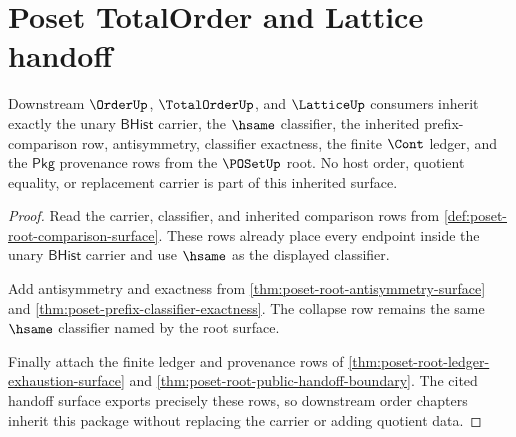 \section{Poset TotalOrder and Lattice handoff}
\label{sec:poset-totalorder-lattice-handoff}

\begin{theorem}
\label{thm:poset-totalorder-lattice-handoff-carrier}
Downstream $\OrderUp$, $\TotalOrderUp$, and $\LatticeUp$ consumers inherit
exactly the unary $\mathsf{BHist}$ carrier, the $\hsame$ classifier, the
inherited prefix-comparison row, antisymmetry, classifier exactness, the
finite $\Cont$ ledger, and the $\mathsf{Pkg}$ provenance rows from the
$\POSetUp$ root. No host order, quotient equality, or replacement carrier is
part of this inherited surface.
\end{theorem}
\begin{proof}
Read the carrier, classifier, and inherited comparison rows from
\autoref{def:poset-root-comparison-surface}. These rows already place every
endpoint inside the unary $\mathsf{BHist}$ carrier and use $\hsame$ as the
displayed classifier.

Add antisymmetry and exactness from
\autoref{thm:poset-root-antisymmetry-surface} and
\autoref{thm:poset-prefix-classifier-exactness}. The collapse row remains the
same $\hsame$ classifier named by the root surface.

Finally attach the finite ledger and provenance rows of
\autoref{thm:poset-root-ledger-exhaustion-surface} and
\autoref{thm:poset-root-public-handoff-boundary}. The cited handoff surface
exports precisely these rows, so downstream order chapters inherit this
package without replacing the carrier or adding quotient data.
\end{proof}

